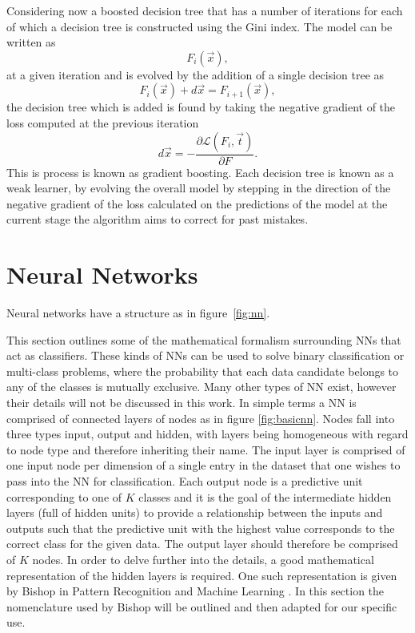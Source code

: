Considering now a boosted decision tree that has a number of iterations for each
of which a decision tree is constructed using the Gini index. The model can be
written as
\begin{equation}
  F_i(\vec{x}),
\end{equation}
at a given iteration and is evolved by the addition of a single decision tree as
\begin{equation}
  F_i({\vec{x}}) + d{\vec{x}} = F_{i+1}(\vec{x}),
\end{equation}
the decision tree which is added is found by taking the negative gradient of the
loss computed at the previous iteration
\begin{equation}
  d{\vec{x}} = - \frac{\partial \mathcal{L}(F_i, \vec{t})}{\partial F}.
\end{equation}
This is process is known as gradient boosting. Each decision tree is known as a
weak learner, by evolving the overall model by stepping in the direction of the
negative gradient of the loss calculated on the predictions of the model at the
current stage the algorithm aims to correct for past mistakes.

\section{Neural Networks}%
\label{sec:neural-networks}
Neural networks have a structure as in figure~\ref{fig:nn}.

This section outlines some of the mathematical formalism surrounding NNs
that act as classifiers. These kinds of NNs can be used to solve binary
classification or multi-class problems, where the probability that each data
candidate belongs to any of the classes is mutually exclusive. Many other types
of NN exist, however their details will not be discussed in this work. In simple
terms a NN is comprised of connected layers of nodes as in figure
\ref{fig:basicnn}. Nodes fall into three types input, output and hidden, with
layers being homogeneous with regard to node type and therefore inheriting their
name. The input layer is comprised of one input node per dimension of a single
entry in the dataset that one wishes to pass into the NN for classification.
Each output node is a predictive unit corresponding to one of $K$ classes and it
is the goal of the intermediate hidden layers (full of hidden units) to provide
a relationship between the inputs and outputs such that the predictive unit with
the highest value corresponds to the correct class for the given data. The
output layer should therefore be comprised of $K$ nodes. In order to delve
further into the details, a good mathematical representation of the hidden
layers is required. One such representation is given by Bishop in Pattern
Recognition and Machine Learning \cite{PRML}. In this section the nomenclature
used by Bishop will be outlined and then adapted for our specific use.

